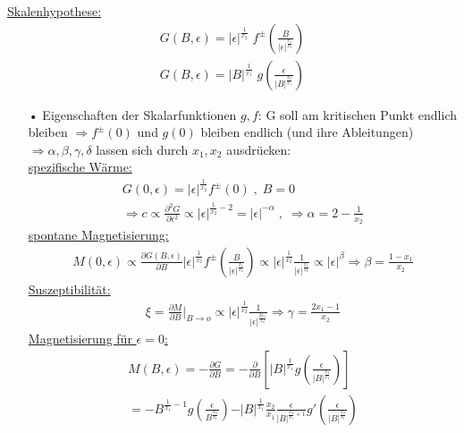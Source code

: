\documentclass[12pt]{article}
\begin{document}
\underline{Skalenhypothese:}
\begin{align}
G(B,\epsilon) = \vert \epsilon \vert ^\frac{1}{x_2} \; f^\pm \left( \frac{B}{\vert \epsilon \vert ^\frac{x_1}{x_2}} \right) \\
G(B,\epsilon) = \vert B \vert ^\frac{1}{x_1} \; g \left( \frac{\epsilon}{\vert B \vert ^\frac{x_2}{x_1}} \right)
\end{align}
\begin{itemize}
\item[•]Eigenschaften der Skalarfunktionen $g,f$: G soll am kritischen Punkt endlich bleiben $\Rightarrow f^\pm (0)$ und $g(0)$ bleiben endlich (und ihre Ableitungen) $\Rightarrow \alpha, \beta, \gamma, \delta$ lassen sich durch $x_1, x_2$ ausdrücken: \\
\underline{spezifische Wärme:} \begin{align}
G(0, \epsilon)= \vert \epsilon \vert
^\frac{1}{x_2} f^\pm (0) \; , \; B=0 \\
\Rightarrow c \propto \frac{\partial^2 G}{\partial \epsilon^2} \propto \vert \epsilon \vert ^{\frac{1}{x_2}-2}= \vert \epsilon \vert ^{-\alpha} \; , \; \Rightarrow \alpha = 2- \frac{1}{x_2} 
\end{align}
\underline{spontane Magnetisierung:} 
\begin{align}
M(0,\epsilon) \propto \frac{\partial G(B, \epsilon)}{\partial B} \vert \epsilon \vert ^\frac{1}{x_2} f^\pm \left(\frac{B}{\vert \epsilon \vert ^\frac{x_1}{x_2}} \right) \propto \vert \epsilon \vert ^\frac{1}{x_2} \frac{1}{\vert \epsilon \vert ^\frac{x_1}{x_2}} \propto \vert \epsilon \vert ^\beta \Rightarrow \beta = \frac{1-x_1}{x_2}
\end{align}
\underline{Suszeptibilität:}
\begin{align}
\xi = \frac{\partial M}{\partial B} \Bigg\vert_{B \to o}
 \propto \vert \epsilon \vert ^\frac{1}{x_2} \frac{1}{\vert \epsilon \vert ^\frac{2 x_1}{x_2}} \Rightarrow \gamma = \frac{2x_1 -1}{x_2}
\end{align}
\underline{Magnetisierung für $\epsilon =0$:}
\begin{align}
M(B,\epsilon) = - \frac{\partial G}{\partial B} = - \frac{\partial}{\partial B} \left[ \vert B \vert ^\frac{1}{x_1} g\left( \frac{\epsilon}{\vert B \vert ^\frac{x_2}{x_1}} \right) \right] \\
= - B^{\frac{1}{x_1}-1} g\left( \frac{\epsilon}{B^\frac{x_2}{x_1}}\right) - \vert B \vert ^\frac{1}{x_1} \frac{x_2}{x_1} \frac{\epsilon}{\vert B \vert ^{\frac{x_2}{x_1}+1} } g'\left( \frac{\epsilon}{\vert B \vert ^\frac{x_2}{x_1} }\right) \\

\end{align}
\end{itemize}
\end{document}
